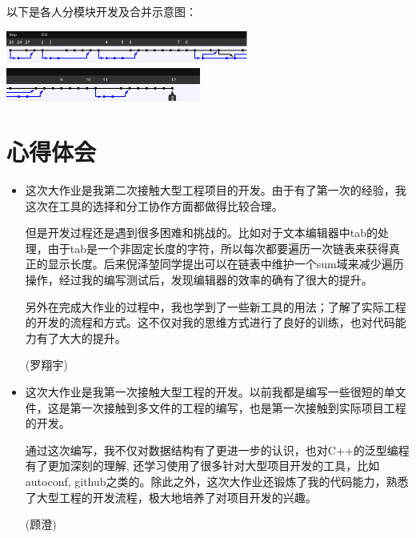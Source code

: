 \documentclass[a4paper,9pt]{article}
\begin{document}
以下是各人分模块开发及合并示意图：
\vspace{1.5em}
\begin{center}
	\includegraphics[height=1.1cm]{branch1.png}
	\includegraphics[height=1.1cm]{branch2.png}
\end{center}

\vspace{2em}
\section{心得体会}
\begin{itemize}
		\item 
这次大作业是我第二次接触大型工程项目的开发。由于有了第一次的经验，我这次在工具的选择和分工协作方面都做得比较合理。

但是开发过程还是遇到很多困难和挑战的。比如对于文本编辑器中tab的处理，由于tab是一个非固定长度的字符，所以每次都要遍历一次链表来获得真正的显示长度。后来倪泽堃同学提出可以在链表中维护一个sum域来减少遍历操作，经过我的编写测试后，发现编辑器的效率的确有了很大的提升。

另外在完成大作业的过程中，我也学到了一些新工具的用法；了解了实际工程的开发的流程和方式。这不仅对我的思维方式进行了良好的训练，也对代码能力有了大大的提升。

(罗翔宇)
	\item
这次大作业是我第一次接触大型工程的开发。以前我都是编写一些很短的单文件，这是第一次接触到多文件的工程的编写，也是第一次接触到实际项目工程的开发。

通过这次编写，我不仅对数据结构有了更进一步的认识，也对C++的泛型编程有了更加深刻的理解, 还学习使用了很多针对大型项目开发的工具，比如autoconf, github之类的。除此之外，这次大作业还锻炼了我的代码能力，熟悉了大型工程的开发流程，极大地培养了对项目开发的兴趣。

(顾澄)
\end{itemize}
\end{document}
